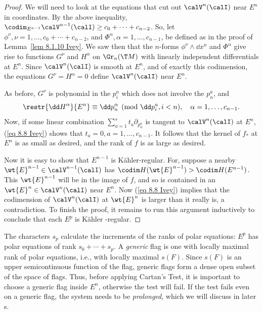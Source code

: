 \begin{proof}
    We will need to look at the equations that cut out $\calV^n(\calI)$ near $E^n$ in coordinates. By the above inequality, $\codim_{E^{n-1}}\calV^{n-1}(\calI)\geq c_0+\cdots+c_{n-2}$. So, let $\phi^\nu,\nu=1,\ldots,c_0+\cdots+c_{n-2}$, and $\Phi^\alpha,\alpha=1,\ldots,c_{n-1}$, be defined as in the proof of Lemma~\ref{lem 8.1.10 Ivey}. We saw then that the $n$-forms $\phi^\nu\wedge\dd x^n$ and $\Phi^\alpha$ give rise to functions $G^\nu$ and $H^\alpha$ on $\Gr_n(\T M)$ with linearly independent differentials at $E^n$. Since $\calV^n(\calI)$ is smooth at $E^n$, and of exactly this codimension, the equations $G^\nu=H^\alpha=0$ define $\calV^n(\calI)$ near $E^n$.

    As before, $G^\nu$ is polynomial in the $p^a_i$ which does not involve the $p^a_n$, and  
    \[\restr{\dd  H^\alpha}{E^n}\equiv \dd p^\alpha_n\pmod{\dd p^a_i,i<n},\quad \alpha=1,\ldots,c_{n-1}.\label{eq 8.8 Ivey}\]
    Now, if some linear combination $\sum_{a=1}^st_a\partial_{p^a_n}$ is tangent to $\calV^n(\calI)$ at $E^n$, (\ref{eq 8.8 Ivey}) shows that $t_a=0,a=1,\ldots,c_{n-1}$. It follows that the kernel of $f_\ast$ at $E^n$ is as small as desired, and the rank of $f$ is as large as desired.

    Now it is easy to show that $E^{n-1}$ is K\"ahler-regular. For, suppose a nearby $\wt{E}^{n-1}\in\calV^{n-1}(\calI)$ has $\codim H(\wt{E}^{n-1})>\codim H(E^{n-1})$. This $\wt{E}^{n-1}$ will be in the image of $f$, and so is contained in an $\wt{E}^n\in \calV^n(\calI)$ near $E^n$. Now (\ref{eq 8.8 Ivey}) implies that the codimension of $\calV^n(\calI )$ at $\wt{E}^n$ is larger than it really is, a contradiction. To finish the proof, it remains to run this argument inductively to conclude that each $E^p$ is K\"ahler -regular.
\end{proof}

\begin{rem}
    The characters $s_p$ calculate the increments of the ranks of polar equations: $E^p$ has polar equations of rank $s_0+\cdots+s_p$. A \emph{generic} flag is one with locally maximal rank of polar equations, i.e., with locally maximal $s(F)$. Since $s(F)$ is an upper semicontinuous function of the flag, generic flags form a dense open subset of the space of flags. Thus, before applying Cartan's Test, it is important to choose a generic flag inside $E^n$, otherwise the test will fail. If the test fails even on a generic flag, the system needs to be \emph{prolonged}, which we will discuss in later \sect s.
\end{rem}



